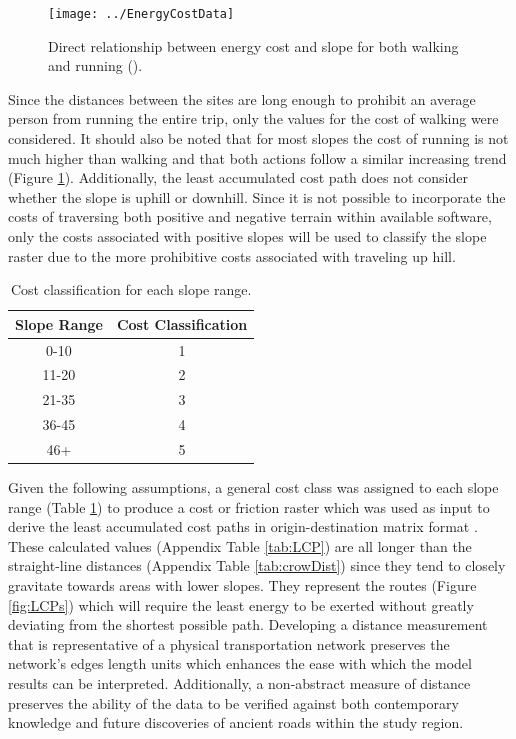 \documentclass[12pt,a4paper]{thesis}
\begin{document}
\begin{figure}
\centering
\texttt{[image: ../EnergyCostData]}
\caption{Direct relationship between energy cost and slope for both walking and running (\citep{Min02}).}
\label{fig:EnergyCostData}
\end{figure}



Since the distances between the sites are long enough to prohibit an average person from running the entire trip, only the values for the cost of walking were considered. It should also be noted that for most slopes the cost of running is not much higher than walking and that both actions follow a similar increasing trend (Figure \ref{fig:EnergyCostData}). Additionally, the least accumulated cost path does not consider whether the slope is uphill or downhill. Since it is not possible to incorporate the costs of traversing both positive and negative terrain within available software, only the costs associated with positive slopes will be used to classify the slope raster due to the more prohibitive costs associated with traveling up hill. 

\begin{table}
\centering
\caption{Cost classification for each slope range.}
\begin{tabular}{|c|c|}
\hline Slope Range & Cost Classification \\ 
\hline 0-10 & 1 \\ 
\hline 11-20 & 2 \\ 
\hline 21-35 & 3 \\ 
\hline 36-45 & 4 \\ 
\hline 46+ & 5 \\ 
\hline 
\end{tabular} 
\label{tab:slopeClass}
\end{table}

Given the following assumptions, a general cost class was assigned to each slope range (Table \ref{tab:slopeClass}) to produce a cost or friction raster which was used as input to derive the least accumulated cost paths in origin-destination matrix format \citep{Eth11}. These calculated values (Appendix Table \ref{tab:LCP}) are all longer than the straight-line distances (Appendix Table \ref{tab:crowDist}) since they tend to closely gravitate towards areas with lower slopes. They represent the routes (Figure \ref{fig:LCPs}) which will require the least energy to be exerted without greatly deviating from the shortest possible path. Developing a distance measurement that is representative of a physical transportation network preserves the network's edges length units which enhances the ease with which the model results can be interpreted. Additionally, a non-abstract measure of distance preserves the ability of the data to be verified against both contemporary knowledge and future discoveries of ancient roads within the study region.
\end{document}

